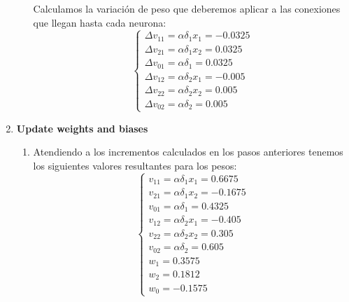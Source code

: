 \begin{problem}[2]
\begin{enumerate}
\begin{enumerate}
Calculamos la variación de peso que deberemos aplicar a las conexiones que llegan hasta cada neurona:
\[\left\{ \begin{array}{l}
Δv_{11}= αδ_1x_1 = -0.0325 \\
Δv_{21}= αδ_1x_2 = 0.0325 \\
Δv_{01}= αδ_1 = 0.0325 \\
Δv_{12}= αδ_2x_1 = -0.005 \\
Δv_{22}= αδ_2x_2 = 0.005 \\
Δv_{02}= αδ_2 = 0.005
\end{array}\right.\]
\end{enumerate}
\item \textbf{Update weights and biases}
\begin{enumerate}
\item Atendiendo a los incrementos calculados en los pasos anteriores tenemos los siguientes valores resultantes para los pesos:
\[\left\{ \begin{array}{l}
v_{11}= αδ_1x_1 = 0.6675 \\
v_{21}= αδ_1x_2 = -0.1675 \\
v_{01}= αδ_1 = 0.4325 \\
v_{12}= αδ_2x_1 = -0.405 \\
v_{22}= αδ_2x_2 = 0.305 \\
v_{02}= αδ_2 = 0.605 \\
w_1    = 0.3575 \\
w_2    = 0.1812 \\
w_0    = -0.1575
\end{array}\right.\]
\end{enumerate}
\end{enumerate}

\end{problem}

